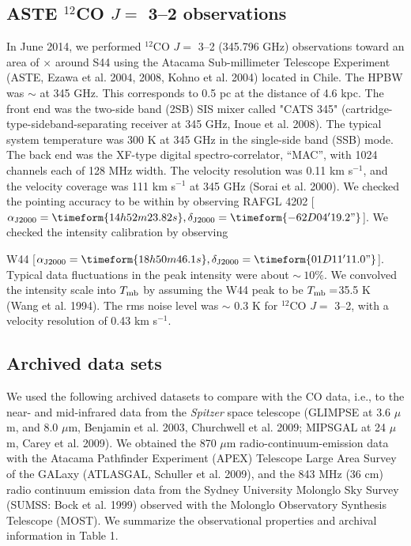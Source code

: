 \documentclass[onecolumn]{pasj01}
\begin{document}
{{\subsection{ASTE $^{12}$CO $J=$ 3--2 observations}
{In June 2014,} we performed $^{12}$CO $J=$ 3--2 (345.796 GHz) observations {toward an area of $\times$  {around} S44 using} the Atacama Sub-millimeter Telescope Experiment (ASTE, Ezawa et al. 2004, 2008, Kohno et al. 2004) located in Chile. 
{The HPBW} {was} $\sim$  at 345 GHz.  This corresponds to 0.5 pc at the distance of 4.6 kpc.
The front end was the two-side band (2SB) SIS mixer called "CATS 345" (cartridge-type-sideband-separating receiver at 345 GHz, Inoue et al. 2008). 
The typical system temperature was {300 K at 345 GHz} in the single-side band (SSB) {mode}. The back end was the XF-type digital spectro-correlator, “MAC”, with 1024 channels {each} of 128 MHz {width.} The velocity resolution was 0.11 km s$^{-1}$, and the velocity coverage was 111 km s$^{-1}$ at 345 GHz (Sorai et al. 2000). {We checked} the {pointing} accuracy to be within  by observing RAFGL 4202 [$\alpha_{\rm J2000} =\timeform{14h52m23.82s}, \delta_{\rm J2000} = \timeform{-62D04'19.2"}$]. 
{We checked} the intensity {calibration} by observing {W44 [$\alpha_{\rm J2000} =\timeform{18h50m46.1s}, \delta_{\rm J2000} = \timeform{01D11'11.0"}$]. {Typical data fluctuations in {the peak intensity} were about $\sim \ 10\%$}.
{We convolved} the intensity scale into $T_{\rm mb}$ by assuming the W44 peak to be $T_{\rm mb} = $35.5 K (Wang et al. 1994). 
The rms noise level was $\sim$ 0.3 K for $^{12}$CO $J =$ 3--2, with a velocity resolution of 0.43 km s$^{-1}$.   

\subsection{{Archived} data sets}
{We used the following {archived} datasets to compare with the CO data{,} i.e., {to} the near- and mid-infrared data from {the} {\it Spitzer} space telescope {(GLIMPSE {at} 3.6 $\mu$m, and 8.0 $\mu$m, Benjamin et al. 2003, Churchwell et al. 2009; MIPSGAL {at} 24 $\mu$m, Carey et al. 2009)}. {We  obtained} the 870 $\mu$m radio-continuum-emission data with the Atacama Pathfinder Experiment (APEX) Telescope Large Area Survey of the GALaxy {(ATLASGAL, Schuller et al. 2009)}, and the 843 MHz (36 cm)
 radio continuum emission data from {the Sydney University Molonglo Sky Survey (SUMSS: {Bock et al. 1999}) observed with the Molonglo Observatory Synthesis Telescope (MOST). We summarize the observational properties and archiv{al} information in Table 1.}}


}}}
\end{document}

